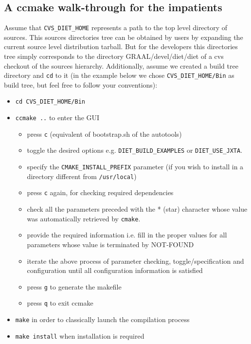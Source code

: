 \subsection{A ccmake walk-through for the impatients}

Assume that \verb+CVS_DIET_HOME+ represents a path to the top level
directory of \diet sources.  This \diet sources directories tree can
be obtained by \diet users by expanding the \diet current source level
distribution tarball. But for the \diet developers this directories
tree simply corresponds to the directory GRAAL/devel/diet/diet of a
cvs checkout of the \diet sources hierarchy.  Additionally, assume we
created a build tree directory and \verb+cd+ to it (in the example
below we chose \verb+CVS_DIET_HOME/Bin+ as build tree, but feel free
to follow your conventions):
\begin{itemize}
\item
  \verb+cd CVS_DIET_HOME/Bin+
\item
  \verb+ccmake ..+ to enter the GUI
  \begin{itemize}
  \item press \verb+c+ (equivalent of bootstrap.sh of the autotools)
  \item toggle the desired options e.g. \verb+DIET_BUILD_EXAMPLES+ or
    \verb+DIET_USE_JXTA+. 
  \item specify the \verb+CMAKE_INSTALL_PREFIX+ parameter (if you wish
    to install in a directory different from \verb+/usr/local+)
  \item press \verb+c+ again, for checking required dependencies
  \item check all the parameters preceded with the * (star) character
    whose value was automatically retrieved by \verb+cmake+.
  \item provide the required information i.e. fill in the proper
    values for all parameters whose value is terminated by NOT-FOUND
  \item iterate the above process of parameter checking,
    toggle/specification and configuration until all configuration
    information is satisfied
  \item press \verb+g+ to generate the makefile
  \item press \verb+q+ to exit ccmake
  \end{itemize}
\item
  \verb+make+ in order to classically launch the compilation process
\item
  \verb+make install+ when installation is required
\end{itemize}

